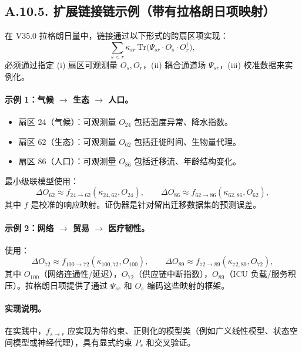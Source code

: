\documentclass[11pt,a4paper]{article}
\begin{document}
	\subsection*{A.10.5. 扩展链接链示例（带有拉格朗日项映射）}
	
	在 V35.0 拉格朗日量中，链接通过以下形式的跨扇区项实现：
	$$
	\sum_{s<r}\kappa_{sr}\,\mathrm{Tr}\!\big(\Psi_{sr}\cdot O_s\cdot O_r^\dagger\big),
	$$
	必须通过指定 (i) 扇区可观测量 $O_s,O_r$，(ii) 耦合通道场 $\Psi_{sr}$，(iii) 校准数据来实例化。
	
	\paragraph{示例 1：气候 $\rightarrow$ 生态 $\rightarrow$ 人口。}
	\begin{itemize}[leftmargin=*]
		\item 扇区 24（气候）：可观测量 $O_{24}$ 包括温度异常、降水指数。
		\item 扇区 62（生态）：可观测量 $O_{62}$ 包括迁徙时间、生物量代理。
		\item 扇区 86（人口）：可观测量 $O_{86}$ 包括迁移流、年龄结构变化。
	\end{itemize}
	最小级联模型使用：
	$$
	\Delta O_{62}\approx f_{24\to62}(\kappa_{24,62},O_{24}),\qquad
	\Delta O_{86}\approx f_{62\to86}(\kappa_{62,86},O_{62}),
	$$
	其中 $f$ 是校准的响应映射。证伪器是针对留出迁移数据集的预测误差。
	
	\paragraph{示例 2：网络 $\rightarrow$ 贸易 $\rightarrow$ 医疗韧性。}
	使用：
	$$
	\Delta O_{72}\approx f_{100\to72}(\kappa_{100,72},O_{100}),\qquad
	\Delta O_{89}\approx f_{72\to89}(\kappa_{72,89},O_{72}),
	$$
	其中 $O_{100}$（网络连通性/延迟），$O_{72}$（供应链中断指数），$O_{89}$（ICU 负载/服务积压）。拉格朗日项提供了通过 $\Psi_{sr}$ 和 $O_s$ 编码这些映射的框架。
	
	\paragraph{实现说明。}
	在实践中，$f_{s\to r}$ 应实现为带约束、正则化的模型类（例如广义线性模型、状态空间模型或神经代理），具有显式约束 $P_r$ 和交叉验证。
	
\end{document}
